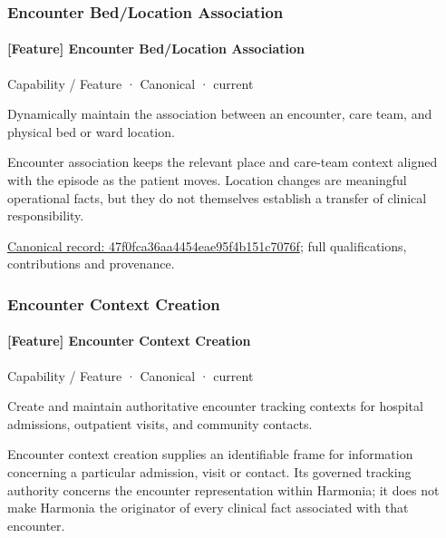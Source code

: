 \subsubsection{Encounter Bed/Location Association}

\paragraph{[Feature] Encounter Bed/Location Association}

\label{element:47f0fca36aa4454eae95f4b151c7076f}
{\small Capability / Feature · Canonical · current}\par

Dynamically maintain the association between an encounter, care team, and physical bed or ward location.



Encounter association keeps the relevant place and care-team context aligned with the episode as the patient moves. Location changes are meaningful operational facts, but they do not themselves establish a transfer of clinical responsibility.


{\footnotesize \href{../../../../continuum/strategy/capability/feature/47f0fca36aa4454eae95f4b151c7076f.md}{Canonical record: 47f0fca36aa4454eae95f4b151c7076f}; full qualifications, contributions and provenance.}\par
\subsubsection{Encounter Context Creation}

\paragraph{[Feature] Encounter Context Creation}

\label{element:817f1046d7e84699a2e2050b84285f95}
{\small Capability / Feature · Canonical · current}\par

Create and maintain authoritative encounter tracking contexts for hospital admissions, outpatient visits, and community contacts.



Encounter context creation supplies an identifiable frame for information concerning a particular admission, visit or contact. Its governed tracking authority concerns the encounter representation within Harmonia; it does not make Harmonia the originator of every clinical fact associated with that encounter.


